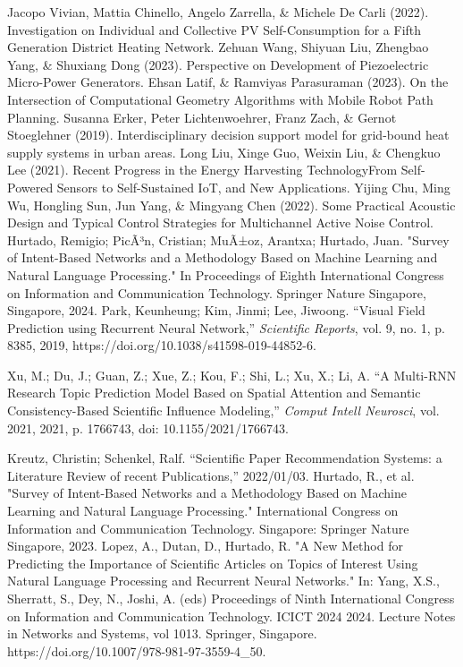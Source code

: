 \documentclass[runningheads]{llncs}
\begin{document}
\begin{thebibliography}{00}
     Jacopo Vivian, Mattia Chinello, Angelo Zarrella, \& Michele De Carli (2022). Investigation on Individual and Collective PV Self-Consumption for a Fifth Generation District Heating Network.
 Zehuan Wang, Shiyuan Liu, Zhengbao Yang, \& Shuxiang Dong (2023). Perspective on Development of Piezoelectric Micro-Power Generators.
 Ehsan Latif, \& Ramviyas Parasuraman (2023). On the Intersection of Computational Geometry Algorithms with Mobile Robot Path Planning.
 Susanna Erker, Peter Lichtenwoehrer, Franz Zach, \& Gernot Stoeglehner (2019). Interdisciplinary decision support model for grid-bound heat supply systems in urban areas.
 Long Liu, Xinge Guo, Weixin Liu, \& Chengkuo Lee (2021). Recent Progress in the Energy Harvesting TechnologyFrom Self-Powered Sensors to Self-Sustained IoT, and New Applications.
 Yijing Chu, Ming Wu, Hongling Sun, Jun Yang, \& Mingyang Chen (2022). Some Practical Acoustic Design and Typical Control Strategies for Multichannel Active Noise Control.
    Hurtado, Remigio; PicÃ³n, Cristian; MuÃ±oz, Arantxa; Hurtado, Juan.
    "Survey of Intent-Based Networks and a Methodology Based on Machine Learning and Natural Language Processing."
    In Proceedings of Eighth International Congress on Information and Communication Technology.
    Springer Nature Singapore, Singapore, 2024.
    Park, Keunheung; Kim, Jinmi; Lee, Jiwoong. 
    ``Visual Field Prediction using Recurrent Neural Network,'' 
    \emph{Scientific Reports}, 
    vol. 9, no. 1, p. 8385, 
    2019, 
    https://doi.org/10.1038/s41598-019-44852-6.
    
    Xu, M.; Du, J.; Guan, Z.; Xue, Z.; Kou, F.; Shi, L.; Xu, X.; Li, A. 
    ``A Multi-RNN Research Topic Prediction Model Based on Spatial Attention and Semantic Consistency-Based Scientific Influence Modeling,'' 
    \emph{Comput Intell Neurosci}, 
    vol. 2021, 
    2021, 
    p. 1766743, 
    doi: 10.1155/2021/1766743.
    
    Kreutz, Christin; Schenkel, Ralf.
    ``Scientific Paper Recommendation Systems: a Literature Review of recent Publications,''
    2022/01/03.
	 Hurtado, R., et al. "Survey of Intent-Based Networks and a Methodology Based on Machine Learning and Natural Language Processing." International Congress on Information and Communication Technology. Singapore: Springer Nature Singapore, 2023.
     Lopez, A., Dutan, D., Hurtado, R. "A New Method for Predicting the Importance of Scientific Articles on Topics of Interest Using Natural Language Processing and Recurrent Neural Networks." In: Yang, X.S., Sherratt, S., Dey, N., Joshi, A. (eds) Proceedings of Ninth International Congress on Information and Communication Technology. ICICT 2024 2024. Lecture Notes in Networks and Systems, vol 1013. Springer, Singapore. https://doi.org/10.1007/978-981-97-3559-4\_50.
\end{thebibliography}
\end{document}
